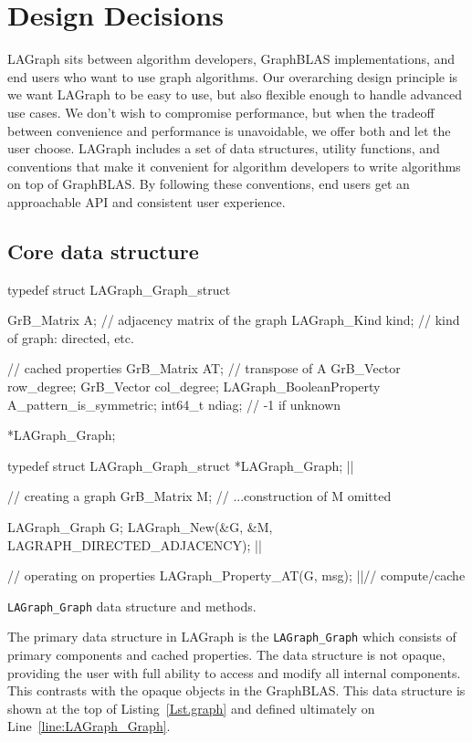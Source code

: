 \section{Design Decisions}
\label{sec:decisions}

LAGraph sits between algorithm developers, GraphBLAS implementations, and end users who want to use graph algorithms.
Our overarching design principle is we want LAGraph to be easy to use,
but also flexible enough to handle advanced use cases.
We don't wish to compromise performance, but when the tradeoff between convenience and performance
is unavoidable, we offer both and let the user choose.
LAGraph includes a set of data structures, utility functions, and conventions
that make it convenient for algorithm developers to write algorithms on top of GraphBLAS.
By following these conventions, end users get an approachable API and consistent user experience.

\subsection{Core data structure}

\begin{listing}
\begin{cplus}
typedef struct LAGraph_Graph_struct
{
    GrB_Matrix   A;      // adjacency matrix of the graph
    LAGraph_Kind kind;   // kind of graph: directed, etc.
    
    // cached properties
    GrB_Matrix   AT;     // transpose of A
    GrB_Vector   row_degree;
    GrB_Vector   col_degree;
    LAGraph_BooleanProperty A_pattern_is_symmetric;
    int64_t      ndiag;  // -1 if unknown
} *LAGraph_Graph;

typedef struct LAGraph_Graph_struct *LAGraph_Graph; |$\label{line:LAGraph_Graph}$|

// creating a graph
GrB_Matrix M;
// ...construction of M omitted

LAGraph_Graph G;
LAGraph_New(&G, &M, LAGRAPH_DIRECTED_ADJACENCY); |$\label{line:CreateGraphObject}$|

// operating on properties
LAGraph_Property_AT(G, msg);  |$\label{line:ComputeTranspose}$|// compute/cache
\end{cplus}
\caption{{\tt LAGraph\_Graph} data structure and methods.}
\label{Lst.graph}
\end{listing}

The primary data structure in LAGraph is the \verb'LAGraph_Graph' which consists of primary components
and cached properties. The data structure is not opaque, providing the user with full ability to access and
modify all internal components. This contrasts with the opaque objects in the GraphBLAS.  This data structure is 
shown at the top of Listing~\ref{Lst.graph} and defined ultimately on Line~\ref{line:LAGraph_Graph}.

